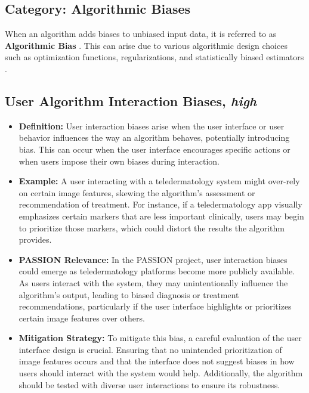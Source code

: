 \begin{refsection}
		\section{\textbf{Category:} Algorithmic Biases}
		When an algorithm adds biases to unbiased input data, it is referred to as \textbf{Algorithmic Bias} \autocite{M9_Baeza-Yates_2018}. This can arise due to various algorithmic design choices such as optimization functions, regularizations, and statistically biased estimators \autocite{M44_Danks_2017}.
		
		\subsection{User Algorithm Interaction Biases, \textit{high}}
		\begin{itemize}
			\item \textbf{Definition:} User interaction biases arise when the user interface or user behavior influences the way an algorithm behaves, potentially introducing bias. This can occur when the user interface encourages specific actions or when users impose their own biases during interaction. \autocite{M9_Baeza-Yates_2018}
			\item \textbf{Example:} A user interacting with a teledermatology system might over-rely on certain image features, skewing the algorithm's assessment or recommendation of treatment. For instance, if a teledermatology app visually emphasizes certain markers that are less important clinically, users may begin to prioritize those markers, which could distort the results the algorithm provides. \textcites{M93_Lerman_2014}{Mehrabi_2021}
			\item \textbf{PASSION Relevance:} In the PASSION project, user interaction biases could emerge as teledermatology platforms become more publicly available. As users interact with the system, they may unintentionally influence the algorithm's output, leading to biased diagnosis or treatment recommendations, particularly if the user interface highlights or prioritizes certain image features over others.
			\item \textbf{Mitigation Strategy:} To mitigate this bias, a careful evaluation of the user interface design is crucial. Ensuring that no unintended prioritization of image features occurs and that the interface does not suggest biases in how users should interact with the system would help. Additionally, the algorithm should be tested with diverse user interactions to ensure its robustness.
		\end{itemize}
		

\end{refsection}
